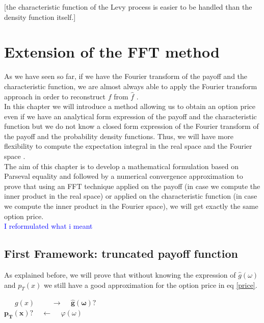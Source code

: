 \documentclass[12pt]{report}
\begin{document}
[the characteristic function  of the Levy process is easier to be handled than the density function itself.]\\
\chapter{Extension of the FFT method }

As we have seen so far, if we have the Fourier transform of the payoff and the characteristic function, we are almost always able to apply the Fourier transform approach in order to reconstruct $f$ from $\hat f$ .\\


In this chapter we will introduce a method allowing us to obtain an option price even if we have an analytical form expression of the payoff and the characteristic function but we do not know a closed form expression of the Fourier transform of the payoff and the probability density functions. Thus, we will have more flexibility to compute the expectation integral in the real space and the Fourier space .\\ 

The aim of this chapter is to develop a mathematical formulation based on Parseval equality  and followed by a numerical convergence approximation to prove that using an FFT technique applied on the payoff (in case we compute the inner product in the real space) or applied on the characteristic function (in case we compute the inner product in the Fourier space), we will get exactly the same option price.\\
\textcolor{blue}{ I reformulated what i meant } \\

\newpage


\section{First Framework: truncated payoff function}

As explained before, we will prove that without knowing the expression of $\hat g (\omega)$ and $p_T(x)$ we still have a good approximation for the option price in eq \eqref{price}.

\begin{center}
 
~~~$g(x)$ ~~~~$\rightarrow$  ~  $ \mathbf{\hat g (\omega) ? }$\\
$\mathbf{{p_T}(x) ?}$ ~  $\leftarrow$ ~  $ \varphi (\omega)$
\end{center}
\end{document}
